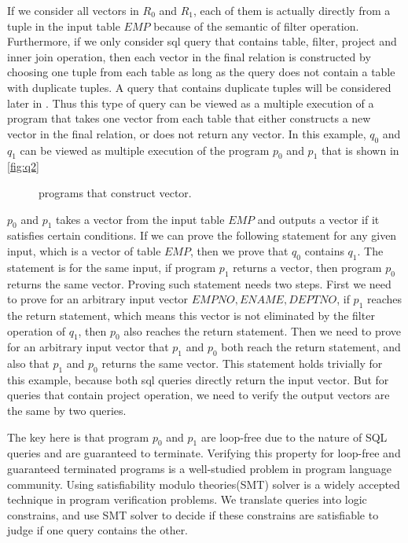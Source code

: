 If we consider all vectors in $R_0$ and $R_1$, each of them is actually directly from a tuple in the input table $EMP$
because of the semantic of filter operation.
%
Furthermore, if we only consider sql query that contains table, filter, project and inner join operation, 
then each vector in the final relation is constructed by choosing one tuple
from each table as long as the query does not contain a table with duplicate tuples.
%
A query that contains duplicate tuples will be considered later in .
%
Thus this type of query can be viewed as a multiple execution of a program that takes one vector
from each table that either constructs a new vector in the final relation, or does not return any vector.
%
In this example, $q_0$ and $q_1$ can be viewed as multiple execution of the program $p_0$ and $p_1$ that is shown in \autoref{fig:q2}
%
\begin{figure}

\caption{%
    programs that construct vector.
  }\label{fig:q2}
\end{figure}
%
$p_0$ and $p_1$ takes a vector from the input table $EMP$ and outputs a vector if it satisfies certain conditions.
%
If we can prove the following statement for any given input, which is a vector of table $EMP$, then we prove that $q_0$ contains $q_1$.
%
The statement is for the same input, if program $p_1$ returns a vector, then program $p_0$ returns the same vector.
%
Proving such statement needs two steps.
%
First we need to prove for an arbitrary input vector $EMPNO,ENAME,DEPTNO$, if $p_1$ reaches the return statement, which means this vector is not 
eliminated by the filter operation of $q_1$, then $p_0$ also reaches the return statement.
%
Then we need to prove for an arbitrary input vector that $p_1$ and $p_0$ both reach the return statement, and also that $p_1$ and $p_0$ returns the same vector.
%
This statement holds trivially for this example, because both sql queries directly return the input vector.
%
But for queries that contain project operation, we need to verify the output vectors are the same by two queries.

The key here is that program $p_0$ and $p_1$ are loop-free due to the nature of SQL queries and are guaranteed to terminate.
%
Verifying this property for loop-free and guaranteed terminated programs is a well-studied problem in program language community.
%
Using satisfiability modulo theories(SMT) solver is a widely accepted technique in program verification problems.
%
We translate queries into logic constrains, and use SMT solver to decide if these constrains are satisfiable to judge if one query contains
the other.


